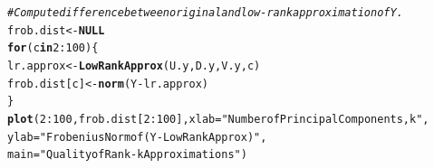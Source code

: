 \documentclass[12pt,letterpaper]{article}\usepackage[]{graphicx}\usepackage[]{color}
\makeatletter
\newcommand{\hlnum}[1]{\textcolor[rgb]{0.686,0.059,0.569}{#1}}%
\newcommand{\hlstr}[1]{\textcolor[rgb]{0.192,0.494,0.8}{#1}}%
\newcommand{\hlcom}[1]{\textcolor[rgb]{0.678,0.584,0.686}{\textit{#1}}}%
\newcommand{\hlopt}[1]{\textcolor[rgb]{0,0,0}{#1}}%
\newcommand{\hlstd}[1]{\textcolor[rgb]{0.345,0.345,0.345}{#1}}%
\newcommand{\hlkwa}[1]{\textcolor[rgb]{0.161,0.373,0.58}{\textbf{#1}}}%
\newcommand{\hlkwb}[1]{\textcolor[rgb]{0.69,0.353,0.396}{#1}}%
\newcommand{\hlkwc}[1]{\textcolor[rgb]{0.333,0.667,0.333}{#1}}%
\newcommand{\hlkwd}[1]{\textcolor[rgb]{0.737,0.353,0.396}{\textbf{#1}}}%
\newenvironment{kframe}{%
 \def\at@end@of@kframe{}%
 \ifinner\ifhmode%
  \def\at@end@of@kframe{\end{minipage}}%
  \begin{minipage}{\columnwidth}%
 \fi\fi%
 \def\FrameCommand##1{\hskip\@totalleftmargin \hskip-\fboxsep
 \colorbox{shadecolor}{##1}\hskip-\fboxsep
     \hskip-\linewidth \hskip-\@totalleftmargin \hskip\columnwidth}%
 \MakeFramed {\advance\hsize-\width
   \@totalleftmargin\z@ \linewidth\hsize
   \@setminipage}}%
 {\par\unskip\endMakeFramed%
 \at@end@of@kframe}
\newenvironment{knitrout}{}{} %
\makeatother
\begin{document}
\begin{knitrout}
\begin{kframe}
\begin{alltt}
\hlcom{# Compute difference between original and low-rank approximation of Y.}
\hlstd{frob.dist} \hlkwb{<-} \hlkwa{NULL}
\hlkwa{for} \hlstd{(c} \hlkwa{in} \hlnum{2}\hlopt{:}\hlnum{100}\hlstd{) \{}
  \hlstd{lr.approx} \hlkwb{<-} \hlkwd{LowRankApprox}\hlstd{(U.y, D.y, V.y, c)}
  \hlstd{frob.dist[c]} \hlkwb{<-} \hlkwd{norm}\hlstd{(Y}\hlopt{-}\hlstd{lr.approx)}
\hlstd{\}}
\hlkwd{plot}\hlstd{(}\hlnum{2}\hlopt{:}\hlnum{100}\hlstd{, frob.dist[}\hlnum{2}\hlopt{:}\hlnum{100}\hlstd{],} \hlkwc{xlab}\hlstd{=}\hlstr{"Number of Principal Components, k"}\hlstd{,}
     \hlkwc{ylab}\hlstd{=}\hlstr{"Frobenius Norm of (Y - LowRankApprox)"}\hlstd{,}
     \hlkwc{main}\hlstd{=}\hlstr{"Quality of Rank-k Approximations"}\hlstd{)}
\end{alltt}
\end{kframe}
\end{knitrout}
\end{document}
